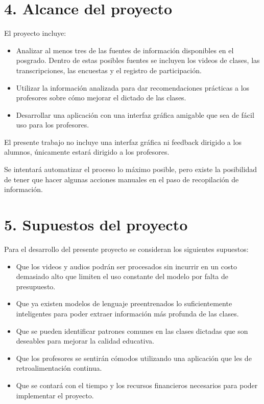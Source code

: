 \documentclass[
11pt, %
codirector, %
]{charter}
\begin{document}
\section{4. Alcance del proyecto}
\label{sec:alcance}

El proyecto incluye:
\begin{itemize}
	\item Analizar al menos tres de las fuentes de información disponibles en el posgrado. Dentro de estas posibles fuentes se incluyen los videos de clases, las transcripciones, las encuestas y el registro de participación.
	\item Utilizar la información analizada para dar recomendaciones prácticas a los profesores sobre cómo mejorar el dictado de las clases.
	\item Desarrollar una aplicación con una interfaz gráfica amigable que sea de fácil uso para los profesores.
	
\end{itemize}

El presente trabajo no incluye una interfaz gráfica ni feedback dirigido a los alumnos, únicamente estará dirigido a los profesores.

Se intentará automatizar el proceso lo máximo posible, pero existe la posibilidad de tener que hacer algunas acciones manuales en el paso de recopilación de información.

\section{5. Supuestos del proyecto}
\label{sec:supuestos}

Para el desarrollo del presente proyecto se consideran los siguientes supuestos:

\begin{itemize}
	\item Que los videos y audios podrán ser procesados sin incurrir en un costo demasiado alto que limiten el uso constante del modelo por falta de presupuesto.
	\item Que ya existen modelos de lenguaje preentrenados lo suficientemente inteligentes para poder extraer información más profunda de las clases.
	\item Que se pueden identificar patrones comunes en las clases dictadas que son deseables para mejorar la calidad educativa.
        \item Que los profesores se sentirán cómodos utilizando una aplicación que les de retroalimentación continua.
        \item Que se contará con el tiempo y los recursos financieros necesarios para poder implementar el proyecto.
\end{itemize}
\end{document}
